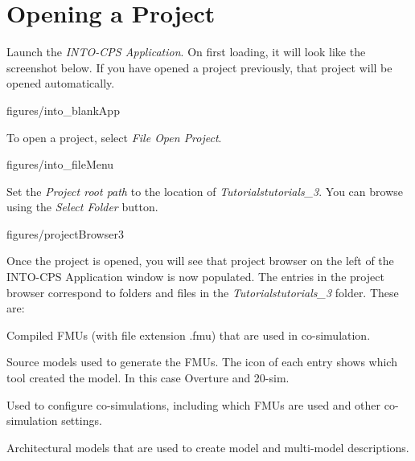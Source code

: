 \documentclass[11pt,a4paper]{../tutorial}
\begin{document}
\section{Opening a Project}
\begin{instructions}
\item Launch the \emph{INTO-CPS Application}. On first loading, it will look like the screenshot below. If you have opened a project previously, that project will be opened automatically.

\begin{annotation}[width=0.85\linewidth,trim=0 150 0 0,clip]{figures/into_blankApp}
    \end{annotation}

\newpage
\item To open a project, select \emph{File \menusep Open Project}.

\begin{annotation}[width=0.85\linewidth,trim=0 260 0 0,clip]{figures/into_fileMenu}
    \end{annotation}

\item Set the \emph{Project root path} to the location of \emph{Tutorials\pathsep{}tutorials\_3}. You can browse using the \emph{Select Folder} button.

\begin{annotation}[width=0.85\linewidth]{figures/projectBrowser3}
\end{annotation}

\newpage
\item Once the project is opened, you will see that project browser on the left of the INTO-CPS Application window is now populated. The entries in the project browser correspond to folders and files in the \emph{Tutorials\pathsep{}tutorials\_3} folder. These are:

    \begin{description}[noitemsep]
        \item[FMUs] Compiled FMUs (with file extension .fmu) that are used in co-simulation.
        \item[Models] Source models used to generate the FMUs. The icon of each entry shows which tool created the model. In this case Overture and 20-sim.
        \item[Multi-models] Used to configure co-simulations, including which FMUs are used and other co-simulation settings.
        \item[SysML] Architectural models that are used to create model and multi-model descriptions.
    \end{description}


\end{instructions}
\end{document}
